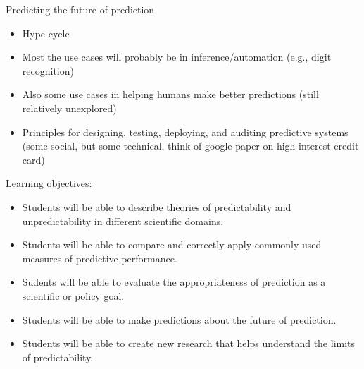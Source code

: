 \documentclass[aspectratio=169]{beamer}
\begin{document}
\begin{frame}

Predicting the future of prediction
\begin{itemize}
\item Hype cycle
\pause
\item Most the use cases will probably be in inference/automation (e.g., digit recognition)
\pause
\item Also some use cases in helping humans make better predictions (still relatively unexplored)
\pause
\item Principles for designing, testing, deploying, and auditing predictive systems (some social, but some technical, think of google paper on high-interest credit card)
\end{itemize}

\end{frame}
\begin{frame}

Learning objectives:
\begin{itemize}
\item Students will be able to describe theories of predictability and unpredictability in different scientific domains.
\item Students will be able to compare and correctly apply commonly used measures of predictive performance.
\item Sudents will be able to evaluate the appropriateness of prediction as a scientific or policy goal.
\item Students will be able to make predictions about the future of prediction.
\item Students will be able to create new research that helps understand the limits of predictability.
\end{itemize}

\end{frame}

\frame{\titlepage}
\end{document}
